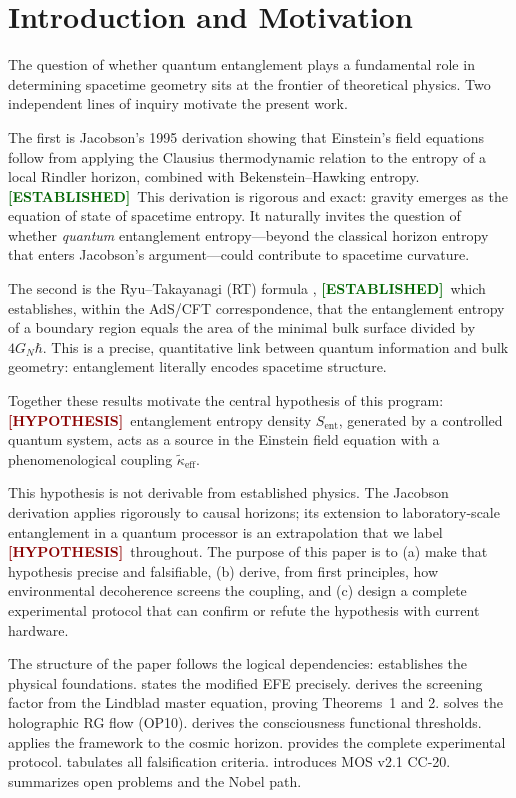 \documentclass[12pt,a4paper]{article}
\newcommand{\EST}{\textcolor{darkgreen}{\textbf{[ESTABLISHED]}}}
\newcommand{\HYP}{\textcolor{darkred}{\textbf{[HYPOTHESIS]}}}
\theoremstyle{monette}
\theoremstyle{definition}
\newcommand{\keff}{\tilde{\kappa}_{\mathrm{eff}}}
\newcommand{\Sent}{S_{\mathrm{ent}}}
\begin{document}
\tableofcontents
\newpage

\section{Introduction and Motivation}
\label{sec:intro}

The question of whether quantum entanglement plays a fundamental role in determining
spacetime geometry sits at the frontier of theoretical physics.
Two independent lines of inquiry motivate the present work.

The first is Jacobson's 1995 derivation \cite{Jacobson1995} showing that Einstein's
field equations follow from applying the Clausius thermodynamic relation to the entropy
of a local Rindler horizon, combined with Bekenstein--Hawking entropy.
\EST\ This derivation is rigorous and exact: gravity emerges as the equation of state
of spacetime entropy. It naturally invites the question of whether \emph{quantum}
entanglement entropy---beyond the classical horizon entropy that enters Jacobson's
argument---could contribute to spacetime curvature.

The second is the Ryu--Takayanagi (RT) formula \cite{RyuTakayanagi2006},
\EST\ which establishes, within the AdS/CFT correspondence, that the entanglement
entropy of a boundary region equals the area of the minimal bulk surface divided by
$4G_N\hbar$. This is a precise, quantitative link between quantum information and
bulk geometry: entanglement literally encodes spacetime structure.

Together these results motivate the central hypothesis of this program:
\HYP\ entanglement entropy density $\Sent$, generated by a controlled
quantum system, acts as a source in the Einstein field equation with a
phenomenological coupling $\keff$.

This hypothesis is not derivable from established physics.
The Jacobson derivation applies rigorously to causal horizons; its extension to
laboratory-scale entanglement in a quantum processor is an extrapolation that we
label \HYP\ throughout. The purpose of this paper is to (a) make that hypothesis
precise and falsifiable, (b) derive, from first principles, how environmental
decoherence screens the coupling, and (c) design a complete experimental protocol
that can confirm or refute the hypothesis with current hardware.

The structure of the paper follows the logical dependencies:
 establishes the physical foundations.
 states the modified EFE precisely.
 derives the screening factor from the Lindblad master equation,
proving Theorems~1 and 2.
 solves the holographic RG flow (OP10).
 derives the consciousness functional thresholds.
 applies the framework to the cosmic horizon.
 provides the complete experimental protocol.
 tabulates all falsification criteria.
 introduces MOS v2.1 CC-20.
 summarizes open problems and the Nobel path.
\end{document}
